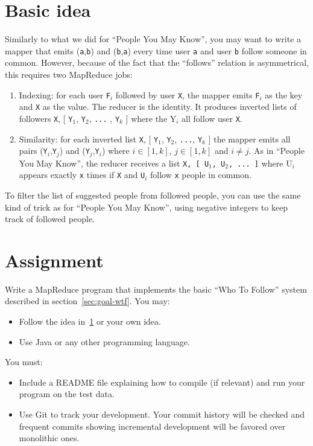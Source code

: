 \documentclass[11pt]{article}
\begin{document}
\section{Basic idea}
\label{sec:idea-wtf}
Similarly to what we did for ``People You May Know'', you may want to
write a mapper that emits (\texttt{a},\texttt{b}) and
(\texttt{b},\texttt{a}) every time user \texttt{a} and user \texttt{b}
follow someone in common. However, because of the fact that the ``follows'' relation is
asymmetrical, this requires two MapReduce jobs:
\begin{enumerate}
  \item Indexing: for each user \texttt{F$_i$} followed by user
    \texttt{X}, the mapper emits \texttt{F$_i$} as the key and \texttt{X}
    as the value. The reducer is the identity. It produces inverted
    lists of followers \texttt{X}, [ \texttt{Y$_1$}, \texttt{Y$_2$},
    \texttt{...} , \texttt{Y$_k$} ] where the Y$_i$ all follow user
    \texttt{X}.
  \item Similarity: for each inverted list \texttt{X}, [
    \texttt{Y$_1$}, \texttt{Y$_2$}, \texttt{...}, \texttt{Y$_k$} ] the
    mapper emits all pairs (\texttt{Y$_i$},\texttt{Y$_j$}) and (\texttt{Y$_j$},\texttt{Y$_i$}) where $i
    \in [1,k]$, $j \in [1,k]$ and $i \neq j$. As in ``People You May
    Know'', the reducer receives a list \texttt{X, [ U$_1$, U$_2$,
        ... ]} where U$_i$ appears exactly \texttt{x} times if
    \texttt{X} and \texttt{U$_i$} follow \texttt{x} people in common.
\end{enumerate}

To filter the list of suggested people from followed people, you can
use the same kind of trick as for ``People You May Know'', using
negative integers to keep track of followed people.

\section{Assignment}

Write a MapReduce program that implements the basic ``Who To Follow'' system
described in section~\ref{sec:goal-wtf}. You may:
\begin{itemize}
\item Follow the
  idea in~\ref{sec:idea-wtf} or your own idea.
\item Use Java or any other programming
  language.
\end{itemize}
You must:
\begin{itemize}
\item Include a README file explaining how to compile (if
  relevant) and run your program on the test data.
\item Use Git to track your development. Your commit history will be
  checked and frequent commits showing incremental development will be
  favored over monolithic ones.
\end{itemize}
\end{document}
